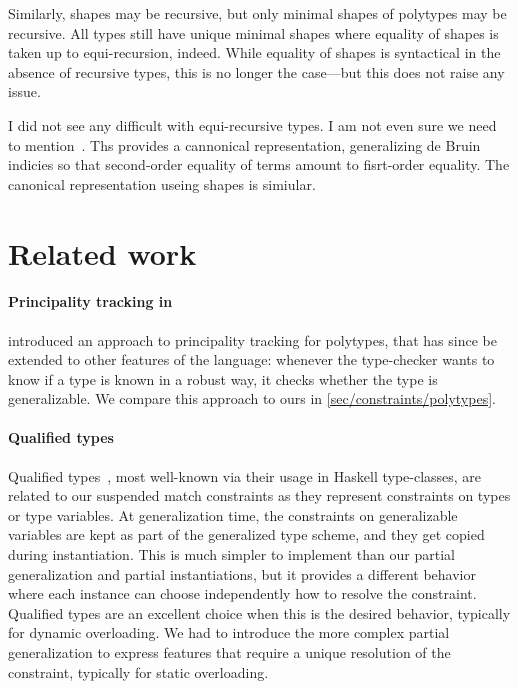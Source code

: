 \documentclass[acmsmall,screen,nonacm,review]{acmart}
\begin{document}
Similarly, shapes may be recursive, but only minimal shapes of polytypes may
be recursive. All types still have unique minimal shapes where equality of
shapes is taken up to equi-recursion, indeed.  While equality of shapes is
syntactical in the absence of recursive types, this is no longer the
case---but this does not raise any issue.

\begin{version}{}
I did not see any difficult with equi-recursive types.
I am not even sure we need to mention~\cite
{Gauthier-Pottier/numbering@icfp04}.
Ths provides a cannonical representation, generalizing de Bruin indicies so
that second-order equality of terms amount to fisrt-order equality.
The canonical representation useing shapes is simiular.

\end{version}

\section{Related work}
\label{sec:related-work}


\paragraph{Principality tracking in \OCaml}
\citet*{Garrigue-Remy/poly-ml} introduced an approach to principality
tracking for polytypes, that has since be extended to other features
of the \OCaml language: whenever the type-checker wants to know if
a type is known in a robust way, it checks whether the type is
generalizable. We compare this approach to ours in
\cref{sec/constraints/polytypes}.

\paragraph{Qualified types} Qualified
types~\citep*{jones-qualified-types}, most well-known via their usage
in Haskell type-classes, are related to our suspended match
constraints as they represent constraints on types or type
variables. At generalization time, the constraints on generalizable
variables are kept as part of the generalized type scheme, and they
get copied during instantiation. This is much simpler to implement
than our partial generalization and partial instantiations, but it
provides a different behavior where each instance can choose
independently how to resolve the constraint. Qualified types are an
excellent choice when this is the desired behavior, typically for
dynamic overloading. We had to introduce the more complex partial
generalization to express features that require a unique resolution of
the constraint, typically for static overloading.
\end{document}
